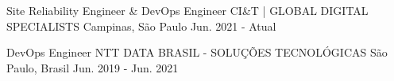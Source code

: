 

\begin{cventries}

  \cventry
    {Site Reliability Engineer \& DevOps Engineer} %
    {CI&T | GLOBAL DIGITAL SPECIALISTS} %
    {Campinas, São Paulo} %
    {Jun. 2021 - Atual} %
    {
      \begin{cvitems} %
      \end{cvitems}
    }

  \cventry
    {DevOps Engineer} %
    {NTT DATA BRASIL - SOLUÇÕES TECNOLÓGICAS} %
    {São Paulo, Brasil} %
    {Jun. 2019 - Jun. 2021} %
    {
      \begin{cvitems} %
      \end{cvitems}
    }
\end{cventries}
